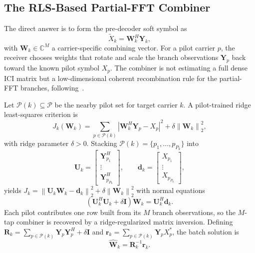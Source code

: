 \documentclass{wileysev}
\newcommand{\C}{\mathbb{C}}
\newcommand{\norm}[1]{\left\lVert #1 \right\rVert}
\begin{document}
	\subsection{The RLS-Based Partial-FFT Combiner}
	\label{ssec:rpc}
	
	The direct answer is to form the pre-decoder soft symbol as
	\begin{equation}
		\widetilde{X}_k = \mathbf{W}_k^{H}\mathbf{Y}_k,
		\label{eq:rpc_basic}
	\end{equation}
	with \(\mathbf{W}_k\in\C^M\) a carrier-specific combining vector. For a pilot carrier \(p\), the receiver chooses weights that rotate and scale the branch observations \(\mathbf{Y}_p\) back toward the known pilot symbol \(X_p\). The combiner is not estimating a full dense ICI matrix but a low-dimensional coherent recombination rule for the partial-FFT branches, following~\cite{partial_fft}.
	
	Let \(\mathcal{P}(k)\subseteq\mathcal{P}\) be the nearby pilot set for target carrier \(k\). A pilot-trained ridge least-squares criterion is
	\begin{equation}
		J_k(\mathbf{W}_k)
		=
		\sum_{p\in\mathcal{P}(k)}
		\left|
		\mathbf{W}_k^{H}\mathbf{Y}_p - X_p
		\right|^2
		+
		\delta \norm{\mathbf{W}_k}_2^2,
		\label{eq:rpc_ls}
	\end{equation}
	with ridge parameter \(\delta>0\). Stacking \(\mathcal{P}(k)=\{p_1,\dots,p_{P_k}\}\) into
	\[
	\mathbf{U}_k
	=
	\begin{bmatrix}
		\mathbf{Y}_{p_1}^{H} \\
		\vdots \\
		\mathbf{Y}_{p_{P_k}}^{H}
	\end{bmatrix},
	\qquad
	\mathbf{d}_k
	=
	\begin{bmatrix}
		X_{p_1} \\
		\vdots \\
		X_{p_{P_k}}
	\end{bmatrix},
	\]
	yields \(J_k = \norm{\mathbf{U}_k\mathbf{W}_k-\mathbf{d}_k}_2^2 + \delta\norm{\mathbf{W}_k}_2^2\) with normal equations
	\begin{equation}
		(\mathbf{U}_k^{H}\mathbf{U}_k+\delta\mathbf{I})\mathbf{W}_k
		=
		\mathbf{U}_k^{H}\mathbf{d}_k.
		\label{eq:rpc_normal_eq}
	\end{equation}
	Each pilot contributes one row built from its \(M\) branch observations, so the \(M\)-tap combiner is recovered by a ridge-regularized matrix inversion. Defining \(\mathbf{R}_k=\sum_{p\in\mathcal{P}(k)}\mathbf{Y}_p\mathbf{Y}_p^{H}+\delta\mathbf{I}\) and \(\mathbf{r}_k=\sum_{p\in\mathcal{P}(k)}\mathbf{Y}_p X_p^{*}\), the batch solution is
	\begin{equation}
		\widehat{\mathbf{W}}_k
		=
		\mathbf{R}_k^{-1}\mathbf{r}_k.
		\label{eq:rpc_batch}
	\end{equation}
	
\end{document}
